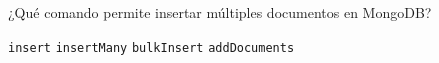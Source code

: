 \question[1] ¿Qué comando permite insertar múltiples documentos en MongoDB?
\begin{choices}
\choice \texttt{insert}
\CorrectChoice \texttt{insertMany}
\choice \texttt{bulkInsert}
\choice \texttt{addDocuments}
\end{choices}